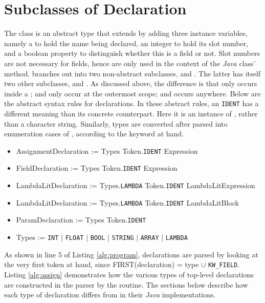 \section{Subclasses of Declaration}

The class  is an abstract type that extends  by adding three instance variables, namely a  to hold the name being declared, an integer to hold its slot number, and a boolean property to distinguish whether this is a field or not. Slot numbers are not necessary for fields, hence are only used in the context of the \emph{Java} class'  method.  branches out into two non-abstract subclasses,  and . The latter has itself two other subclasses,  and . As discussed above, the difference is that  only occurs inside a ;  and  only occur at the outermost scope; and  occurs anywhere. Below are the abstract syntax rules for declarations. In these abstract rules, an \texttt{IDENT} has a different meaning than its concrete counterpart. Here it is an instance of , rather than a character string. Similarly, types are converted after parsed into enumeration cases of , according to the keyword at hand.

\begin{itemize}
	\item AssignmentDeclaration := Types Token.\texttt{IDENT} Expression
	\item FieldDeclaration := Types Token.\texttt{IDENT} Expression
	\item LambdaLitDeclaration := Types.\texttt{LAMBDA} Token.\texttt{IDENT} LambdaLitExpression
	\item LambdaLitDeclaration := Types.\texttt{LAMBDA} Token.\texttt{IDENT} LambdaLitBlock
	\item ParamDeclaration := Types Token.\texttt{IDENT}
	\item Types := \texttt{INT} $|$ \texttt{FLOAT} $|$ \texttt{BOOL} $|$ \texttt{STRING} $|$ \texttt{ARRAY} $|$ \texttt{LAMBDA}
\end{itemize}

As shown in line 5 of Listing \ref{alg:program}, declarations are parsed by looking at the very first token at hand, since FIRST(declaration) = type $\cup$ \texttt{KW\_FIELD}. Listing \ref{alg:assign} demonstrates how the various types of top-level declarations are constructed in the parser by the  routine. The sections below describe how each type of declaration differs from  in their \emph{Java} implementations.

